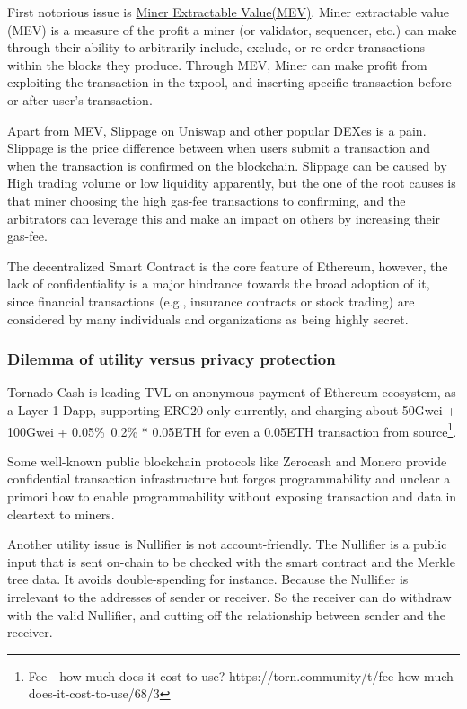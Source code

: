 \documentclass{article}
\begin{document}
First notorious issue is \href{https://ethereum.org/en/developers/docs/mev/}{Miner Extractable Value(MEV)}. Miner extractable value (MEV) is a measure of the profit a miner (or validator, sequencer, etc.) can make through their ability to arbitrarily include, exclude, or re-order transactions within the blocks they produce.  Through MEV, Miner can make profit from exploiting the transaction in the txpool, and inserting specific transaction before or after user's transaction.

Apart from MEV, Slippage on Uniswap and other popular DEXes is a pain. Slippage is the price difference between when users submit a transaction and when the transaction is confirmed on the blockchain.  Slippage can be caused by High  trading volume or low liquidity apparently, but the one of the root causes is that miner choosing the high gas-fee transactions to confirming, and the arbitrators can leverage this and make an impact on others by increasing their gas-fee.

The decentralized Smart Contract is the core feature of Ethereum, however, the lack of confidentiality is a major hindrance towards the broad adoption of it, since financial transactions (e.g., insurance contracts or stock trading) are considered by many individuals and organizations as being highly secret. 

\subsubsection{Dilemma of utility versus privacy protection}

Tornado Cash is leading TVL on anonymous payment of Ethereum ecosystem, as a Layer 1 Dapp, supporting ERC20 only currently, and charging about 50Gwei + 100Gwei + 0.05\%~0.2\% * 0.05ETH for even a 0.05ETH transaction from source\footnote{Fee - how much does it cost to use? https://torn.community/t/fee-how-much-does-it-cost-to-use/68/3}.

Some well-known public blockchain protocols like Zerocash and Monero provide confidential transaction infrastructure but forgos programmability and unclear a primori how to enable programmability without exposing transaction and data in cleartext to miners.

Another utility issue is Nullifier is not account-friendly. The Nullifier is a public input that is sent on-chain to be checked with the smart contract and the Merkle tree data. It avoids double-spending for instance.
Because the Nullifier is irrelevant to the addresses of sender or receiver. So the receiver can do withdraw with the valid Nullifier, and cutting off the relationship between sender and the receiver.
\end{document}
